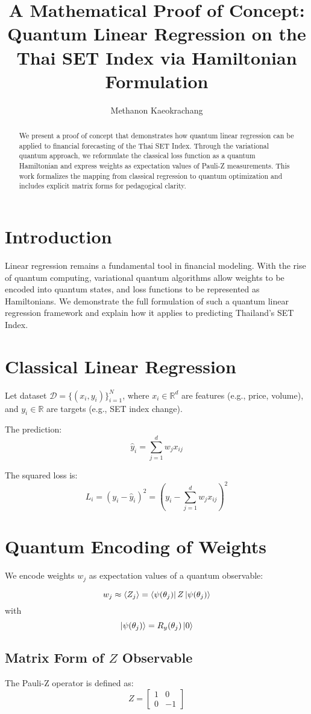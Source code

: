 \documentclass[11pt]{article}
\title{A Mathematical Proof of Concept: Quantum Linear Regression on the Thai SET Index via Hamiltonian Formulation}
\author{Methanon Kaeokrachang}
\affil{Bangkok, Thailand}
\date{}
\begin{document}
\maketitle

\begin{abstract}
We present a proof of concept that demonstrates how quantum linear regression can be applied to financial forecasting of the Thai SET Index. Through the variational quantum approach, we reformulate the classical loss function as a quantum Hamiltonian and express weights as expectation values of Pauli-Z measurements. This work formalizes the mapping from classical regression to quantum optimization and includes explicit matrix forms for pedagogical clarity.
\end{abstract}

\section{Introduction}
Linear regression remains a fundamental tool in financial modeling. With the rise of quantum computing, variational quantum algorithms allow weights to be encoded into quantum states, and loss functions to be represented as Hamiltonians. We demonstrate the full formulation of such a quantum linear regression framework and explain how it applies to predicting Thailand's SET Index.

\section{Classical Linear Regression}
Let dataset $\mathcal{D} = \{(x_i, y_i)\}_{i=1}^N$, where $x_i \in \mathbb{R}^d$ are features (e.g., price, volume), and $y_i \in \mathbb{R}$ are targets (e.g., SET index change).

The prediction:
\[
\hat{y}_i = \sum_{j=1}^d w_j x_{ij}
\]

The squared loss is:
\[
L_i = (y_i - \hat{y}_i)^2 = \left(y_i - \sum_{j=1}^d w_j x_{ij} \right)^2
\]

\section{Quantum Encoding of Weights}
We encode weights $w_j$ as expectation values of a quantum observable:

\[
w_j \approx \langle Z_j \rangle = \bra{\psi(\theta_j)} Z \ket{\psi(\theta_j)}
\]
with
\[
\ket{\psi(\theta_j)} = R_y(\theta_j) \ket{0}
\]

\subsection*{Matrix Form of $Z$ Observable}
The Pauli-Z operator is defined as:
\[
Z = 
\begin{bmatrix}
1 & 0 \\
0 & -1
\end{bmatrix}
\]
\end{document}
